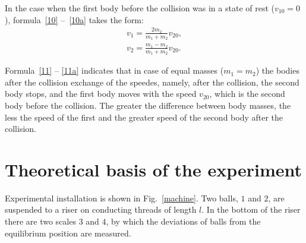 \documentclass{LabWorkEng}
\begin{document}
In the case when the first body before the collision was in a state of rest ($v_{10} = 0$), formula~\eqref{10} --~\eqref{10a} takes the form:
\begin{align}
v_1 = \frac{2m_2}{m_1 + m_2}{v_{20}}, \label{11}\\
v_2 = \frac{m_1 - m_2}{m_1 + m_2}{v_{20}}. \label{11a}
\end{align}

Formula~\eqref{11} -- \eqref{11a} indicates that in case of equal masses ($m_1 = m_2$) the bodies after the collision exchange of the speedes, namely, after the collision, the second body stops, and the first body moves with the speed $v_{20}$, which is the second body before the collision. The greater the difference between body masses, the less the speed of the first and the greater speed of the second body after the collision.

\section{Theoretical basis of the experiment}

Experimental installation is shown in Fig.~\ref{machine}. Two balls, $1$ and $2$, are suspended to a riser on  conducting threads of length $l$. In the bottom of  the riser there are two scales $3$ and $4$, by which the deviations of balls from the equilibrium position are measured.
\end{document}
